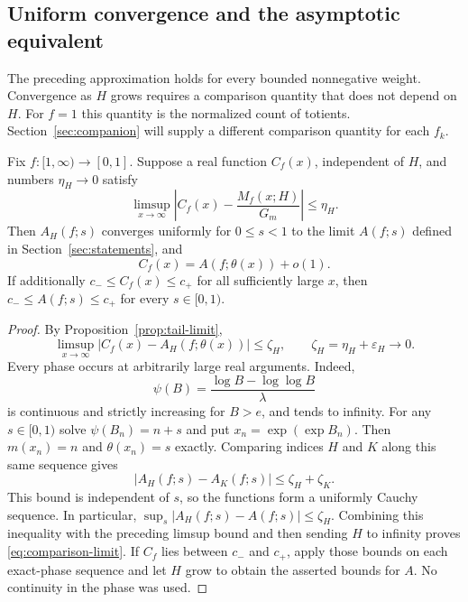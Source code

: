 \subsection{Uniform convergence and the asymptotic equivalent}

The preceding approximation holds for every bounded nonnegative
weight.  Convergence as $H$ grows requires a comparison quantity
that does not depend on $H$.  For $f=1$ this quantity is the
normalized count of totients.  Section~\ref{sec:companion} will
supply a different comparison quantity for each $f_k$.

\begin{lemma}
\label{lem:coefficient-convergence}
Fix $f:[1,\infty)\to[0,1]$.  Suppose a real function $C_f(x)$,
independent of $H$, and numbers $\eta_H\to0$ satisfy
\begin{equation}
 \limsup_{x\to\infty}
 \left|C_f(x)-\frac{M_f(x;H)}{G_m}\right|\le\eta_H.
 \label{eq:common-comparison}
\end{equation}
Then $A_H(f;s)$ converges uniformly for $0\le s<1$ to the
limit $A(f;s)$ defined in Section~\ref{sec:statements}, and
\begin{equation}
 C_f(x)=A(f;\theta(x))+o(1).
 \label{eq:comparison-limit}
\end{equation}
If additionally $c_-\le C_f(x)\le c_+$ for all sufficiently large
$x$, then $c_-\le A(f;s)\le c_+$ for every $s\in[0,1)$.
\end{lemma}

\begin{proof}
By Proposition~\ref{prop:tail-limit},
\[
 \limsup_{x\to\infty}
 |C_f(x)-A_H(f;\theta(x))|\le\zeta_H,
 \qquad \zeta_H=\eta_H+\varepsilon_H\longrightarrow0.
\]
Every phase occurs at arbitrarily large real arguments.  Indeed,
\[
 \psi(B)=\frac{\log B-\log\log B}{\lambda}
\]
is continuous and strictly increasing for $B>e$, and tends to
infinity.  For any $s\in[0,1)$ solve $\psi(B_n)=n+s$ and put
$x_n=\exp(\exp B_n)$.  Then $m(x_n)=n$ and $\theta(x_n)=s$
exactly.  Comparing indices $H$ and $K$ along this same sequence
gives
\[
 |A_H(f;s)-A_K(f;s)|\le\zeta_H+\zeta_K.
\]
This bound is independent of $s$, so the functions form a uniformly
Cauchy sequence.  In particular,
$\sup_s|A_H(f;s)-A(f;s)|\le\zeta_H$.
Combining this inequality with the preceding limsup bound and
then sending $H$ to infinity proves \eqref{eq:comparison-limit}.
If $C_f$ lies between $c_-$ and $c_+$, apply those bounds on each
exact-phase sequence and let $H$ grow to obtain the asserted bounds
for $A$.  No continuity in the phase was used.
\end{proof}

